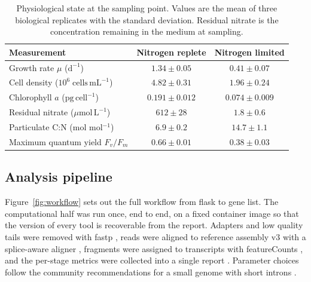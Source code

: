 \begin{table}[t]
  \centering
  \caption{Physiological state at the sampling point. Values are the mean of
  three biological replicates with the standard deviation. Residual nitrate is
  the concentration remaining in the medium at sampling.}
  \label{tab:physiology}
  \begin{tabular}{lcc}
    \toprule
    Measurement & Nitrogen replete & Nitrogen limited \\
    \midrule
    Growth rate $\mu$ ($\mathrm{d^{-1}}$)
      & $1.34 \pm 0.05$ & $0.41 \pm 0.07$ \\
    Cell density ($10^{6}\;\mathrm{cells\,mL^{-1}}$)
      & $4.82 \pm 0.31$ & $1.96 \pm 0.24$ \\
    Chlorophyll $a$ ($\mathrm{pg\,cell^{-1}}$)
      & $0.191 \pm 0.012$ & $0.074 \pm 0.009$ \\
    Residual nitrate ($\mu\mathrm{mol\,L^{-1}}$)
      & $612 \pm 28$ & $1.8 \pm 0.6$ \\
    Particulate C:N (mol mol$^{-1}$)
      & $6.9 \pm 0.2$ & $14.7 \pm 1.1$ \\
    Maximum quantum yield $F_v/F_m$
      & $0.66 \pm 0.01$ & $0.38 \pm 0.03$ \\
    \bottomrule
  \end{tabular}
\end{table}

\subsection{Analysis pipeline}

Figure~\ref{fig:workflow} sets out the full workflow from flask to gene list.
The computational half was run once, end to end, on a fixed container image so
that the version of every tool is recoverable from the report. Adapters and low
quality tails were removed with fastp \citep{chen2018fastp}, reads were aligned
to reference assembly v3 with a splice-aware aligner \citep{dobin2013star},
fragments were assigned to transcripts with featureCounts
\citep{liao2014featurecounts}, and the per-stage metrics were collected into a
single report \citep{ewels2016multiqc}. Parameter choices follow the community
recommendations for a small genome with short introns
\citep{conesa2016survey}.

